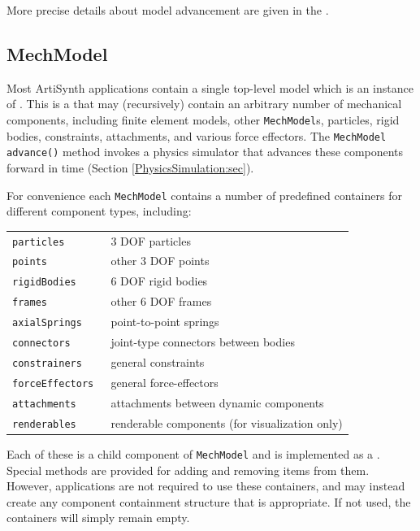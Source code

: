 More precise details about model advancement are given in the 
.

\subsection{MechModel}
\label{MechModel:sec}

Most ArtiSynth applications contain a single top-level model which is
an instance of .  This
is a\pdfbreak
{} that may
(recursively) contain an arbitrary number of mechanical components,
including finite element models, other {\tt MechModel}s, particles,
rigid bodies, constraints, attachments, and various force effectors.
The {\tt MechModel} {\tt advance()} method invokes a physics simulator
that advances these components forward in time (Section
\ref{PhysicsSimulation:sec}).

For convenience each {\tt MechModel} contains a number of predefined
containers for different component types, including:

\begin{shadedregion}
\begin{tabular}{ll}
\tt particles & 3 DOF particles \\
\tt points & other 3 DOF points \\
\tt rigidBodies & 6 DOF rigid bodies \\
\tt frames & other 6 DOF frames \\
\tt axialSprings & point-to-point springs \\
\tt connectors & joint-type connectors between bodies \\
\tt constrainers & general constraints \\
\tt forceEffectors & general force-effectors \\
\tt attachments & attachments between dynamic components \\
\tt renderables & renderable components (for visualization only) \\
\end{tabular}
\end{shadedregion}
Each of these is a child component of {\tt MechModel} and is
implemented as a
. Special methods
are provided for adding and removing items from them. However,
applications are not required to use these containers, and may instead
create any component containment structure that is appropriate.
If not used, the containers will simply remain empty.

